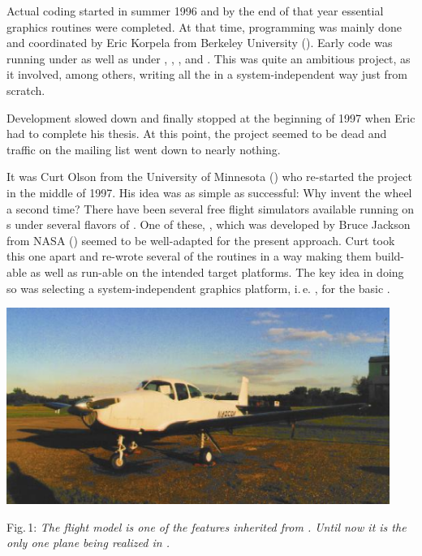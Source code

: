 Actual coding started in summer 1996 and by the end of that year essential graphics
routines were completed. At that time, programming was mainly done and coordinated by
Eric Korpela from Berkeley University
(). Early code was running under  as well as
under , , , and . This was
quite an ambitious project, as it involved, among others, writing all the  in a system-independent way just from scratch.

Development slowed down and finally stopped at the beginning of 1997 when Eric had to
complete his thesis. At this point, the project seemed to be dead and traffic on the
mailing list went down to nearly nothing.

It was Curt Olson from the University of Minnesota
() who re-started the project in the middle of 1997. His idea
was as simple as successful: Why invent the wheel a second time? There have been several
free flight simulators available running on
s under several flavors of . One of these,
, which was developed by Bruce Jackson from NASA
() seemed to be well-adapted for the present approach. Curt
took this one apart and re-wrote several of the routines in a way making them build-able
as well as run-able on the intended target platforms. The key idea in doing so was
selecting a system-independent graphics platform, i.\,e. , for the basic
.
\medskip

 \centerline{
\includegraphics[clip,width=12.5cm]{navion.eps}
}

 \noindent
Fig.\,1: \textit{The  flight model is one of the
features \FlightGear inherited from . Until now it
is the only one plane being realized in \FlightGear.}
\medskip

